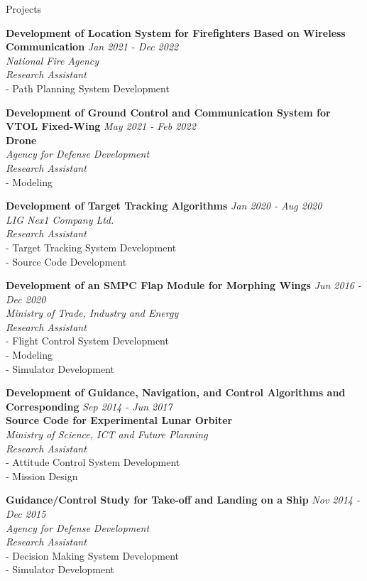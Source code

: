 \documentclass{resume}
\begin{document}
\begin{rSection}{Projects}\normalfont

{\bf Development of Location System for Firefighters Based on Wireless Communication} \hfill {\em Jan 2021 - Dec 2022} 
\\{\textit{ National Fire Agency}}
\\{\textit{ Research Assistant}}
\\- Path Planning System Development

{\textbf{Development of Ground Control and Communication System for VTOL Fixed-Wing} \hfill {\em May 2021 - Feb 2022} \\ \textbf{Drone}} 
\\{\textit{ Agency for Defense Development}}
\\{\textit{ Research Assistant}}
\\- Modeling

{\bf Development of Target Tracking Algorithms} \hfill {\em Jan 2020 - Aug 2020} 
\\{\textit{ LIG Nex1 Company Ltd.}}
\\{\textit{ Research Assistant}}
\\- Target Tracking System Development
\\- Source Code Development

{\bf Development of an SMPC Flap Module for Morphing Wings} \hfill {\em Jun 2016 - Dec 2020} 
\\{\textit{ Ministry of Trade, Industry and Energy}}
\\{\textit{ Research Assistant}}
\\- Flight Control System Development
\\- Modeling
\\- Simulator Development

{\textbf{Development of Guidance, Navigation, and Control Algorithms and Corresponding} \hfill {\em Sep 2014 - Jun 2017} \\ \textbf{Source Code for Experimental Lunar Orbiter}}  
\\{\textit{ Ministry of Science, ICT and Future Planning}}
\\{\textit{ Research Assistant}}
\\- Attitude Control System Development
\\- Mission Design

{\bf Guidance/Control Study for Take-off and Landing on a Ship} \hfill {\em Nov 2014 - Dec 2015} 
\\{\textit{ Agency for Defense Development}}
\\{\textit{ Research Assistant}}
\\- Decision Making System Development
\\- Simulator Development

\end{rSection}
\end{document}

